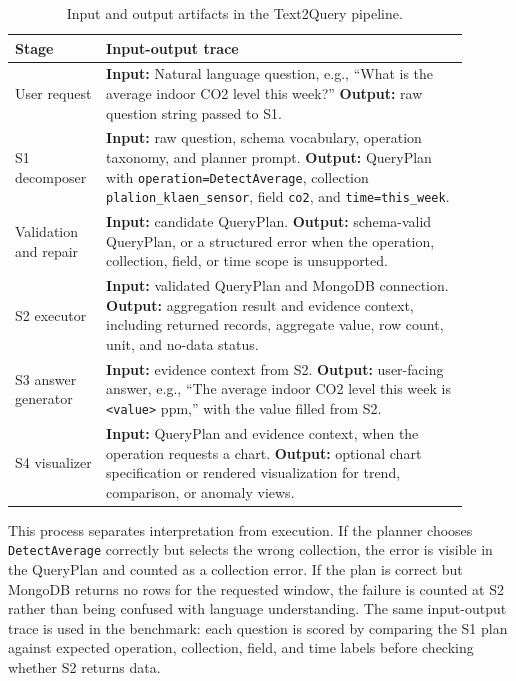 \documentclass[11pt]{article}
\newcommand{\klaencol}{\texttt{plalion\_\allowbreak klaen\_\allowbreak sensor}}
\begin{document}
\begin{table}[!htbp]
\centering
\scriptsize
\caption{Input and output artifacts in the Text2Query pipeline.}
\label{tab:process-io}
\begin{tabular}{>{\raggedright\arraybackslash}p{0.16\linewidth}>{\raggedright\arraybackslash}p{0.74\linewidth}}
\toprule
Stage & Input-output trace \\
\midrule
User request & \textbf{Input:} Natural language question, e.g., ``What is the average indoor CO2 level this week?'' \textbf{Output:} raw question string passed to S1. \\
S1 decomposer & \textbf{Input:} raw question, schema vocabulary, operation taxonomy, and planner prompt. \textbf{Output:} QueryPlan with \texttt{operation=DetectAverage}, collection \klaencol{}, field \texttt{co2}, and \texttt{time=this\_week}. \\
Validation and repair & \textbf{Input:} candidate QueryPlan. \textbf{Output:} schema-valid QueryPlan, or a structured error when the operation, collection, field, or time scope is unsupported. \\
S2 executor & \textbf{Input:} validated QueryPlan and MongoDB connection. \textbf{Output:} aggregation result and evidence context, including returned records, aggregate value, row count, unit, and no-data status. \\
S3 answer generator & \textbf{Input:} evidence context from S2. \textbf{Output:} user-facing answer, e.g., ``The average indoor CO2 level this week is \texttt{<value>} ppm,'' with the value filled from S2. \\
S4 visualizer & \textbf{Input:} QueryPlan and evidence context, when the operation requests a chart. \textbf{Output:} optional chart specification or rendered visualization for trend, comparison, or anomaly views. \\
\bottomrule
\end{tabular}
\end{table}

This process separates interpretation from execution. If the planner chooses \texttt{DetectAverage} correctly but selects the wrong collection, the error is visible in the QueryPlan and counted as a collection error. If the plan is correct but MongoDB returns no rows for the requested window, the failure is counted at S2 rather than being confused with language understanding. The same input-output trace is used in the benchmark: each question is scored by comparing the S1 plan against expected operation, collection, field, and time labels before checking whether S2 returns data.
\end{document}
